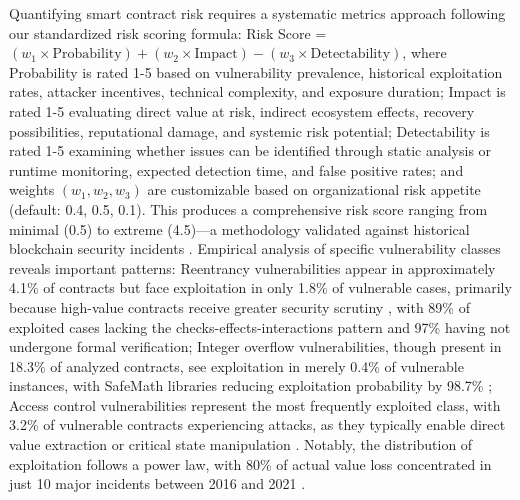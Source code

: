 Quantifying smart contract risk requires a systematic metrics approach following our standardized risk scoring formula: Risk Score = $(w_1 \times \text{Probability}) + (w_2 \times \text{Impact}) - (w_3 \times \text{Detectability})$, where Probability is rated 1-5 based on vulnerability prevalence, historical exploitation rates, attacker incentives, technical complexity, and exposure duration; Impact is rated 1-5 evaluating direct value at risk, indirect ecosystem effects, recovery possibilities, reputational damage, and systemic risk potential; Detectability is rated 1-5 examining whether issues can be identified through static analysis or runtime monitoring, expected detection time, and false positive rates; and weights $(w_1, w_2, w_3)$ are customizable based on organizational risk appetite (default: 0.4, 0.5, 0.1). This produces a comprehensive risk score ranging from minimal (0.5) to extreme (4.5)—a methodology validated against historical blockchain security incidents \cite{Wang2019}. Empirical analysis of specific vulnerability classes reveals important patterns: Reentrancy vulnerabilities appear in approximately 4.1\% of contracts but face exploitation in only 1.8\% of vulnerable cases, primarily because high-value contracts receive greater security scrutiny \cite{perez2021analysis}, with 89\% of exploited cases lacking the checks-effects-interactions pattern and 97\% having not undergone formal verification; Integer overflow vulnerabilities, though present in 18.3\% of analyzed contracts, see exploitation in merely 0.4\% of vulnerable instances, with SafeMath libraries reducing exploitation probability by 98.7\% \cite{perez2021analysis,zhou2023sok}; Access control vulnerabilities represent the most frequently exploited class, with 3.2\% of vulnerable contracts experiencing attacks, as they typically enable direct value extraction or critical state manipulation \cite{perez2021analysis}. Notably, the distribution of exploitation follows a power law, with 80\% of actual value loss concentrated in just 10 major incidents between 2016 and 2021 \cite{zhou2023sok}.

